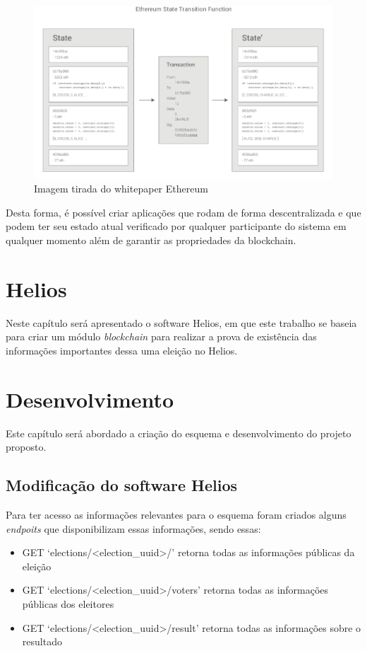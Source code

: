 \documentclass{ufsctex/ufsctex}
\begin{document}
\begin{figure}[h]
	\centering
	\includegraphics[scale=0.3]{ethereum}
	\caption{Imagem tirada do whitepaper Ethereum}
	\label{fig:ethereum}
\end{figure}

Desta forma, é possível criar aplicações que rodam de forma descentralizada e
que podem ter seu estado atual verificado por qualquer participante do sistema
em qualquer momento além de garantir as propriedades da blockchain.

\chapter{Helios}

Neste capítulo será apresentado o software Helios, em que este trabalho se
baseia para criar um módulo \textit{blockchain} para realizar a prova de
existência das informações importantes dessa uma eleição no Helios.

\chapter{Desenvolvimento}
Este capítulo será abordado a criação do esquema e desenvolvimento do projeto proposto.

\section{Modificação do software Helios}
Para ter acesso as informações relevantes para o esquema foram criados alguns \textit{endpoits}
que disponibilizam essas informações, sendo essas:

\begin{itemize}
	\item GET `elections/<election\_uuid>/' retorna todas as informações públicas da eleição
	\item GET `elections/<election\_uuid>/voters' retorna todas as informações públicas dos eleitores
	\item GET `elections/<election\_uuid>/result' retorna todas as informações sobre o resultado
\end{itemize}
\end{document}
